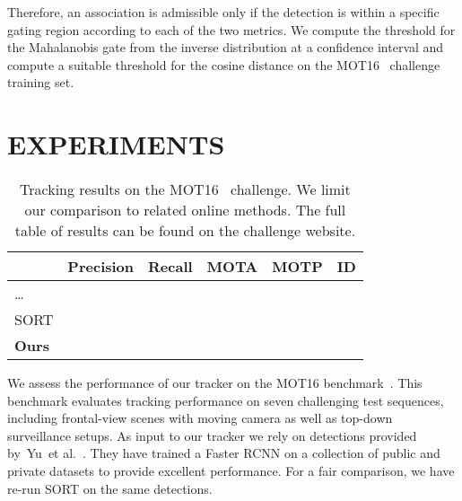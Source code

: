 \documentclass{article}
\newcommand{\etal}{et al.}
\begin{document}
Therefore, an association is admissible only if the detection is within a
specific gating region according to each of the two metrics.
We compute the threshold for the Mahalanobis gate from the inverse 
distribution at a  confidence interval and compute a suitable threshold
for the cosine distance on the MOT16~\cite{milan2016mot16} challenge training
set.
\fi

\section{EXPERIMENTS}
\label{sec:experiments}







\begin{table}[t!]
    \centering
    \begin{tabular}{p{1.2cm}ccccc}
        \toprule
        & \textbf{Precision} & \textbf{Recall} & \textbf{MOTA} & \textbf{MOTP} & \textbf{ID} \\
        \midrule
        \dots & & & & & \\
        SORT & & & & & \\
        \textbf{Ours} & & & & & \\
        \bottomrule
    \end{tabular}
    \caption{Tracking results on the MOT16~\cite{milan2016mot16} challenge. We limit our
    comparison to related online methods. The full table of results can be found on the challenge
    website.}
    \label{tab:mot-results}
\end{table}
\fi

We assess the performance of our tracker on the MOT16
benchmark~\cite{milan2016mot16}.
This benchmark evaluates tracking performance on seven challenging test
sequences, including frontal-view scenes with moving camera as well as top-down
surveillance setups.
As input to our tracker we rely on detections provided
by~Yu~\etal~\cite{yu2016poi}. They have trained a Faster RCNN on a collection
of public and private datasets to provide excellent performance.
For a fair comparison, we have re-run SORT on the same detections.
\end{document}
